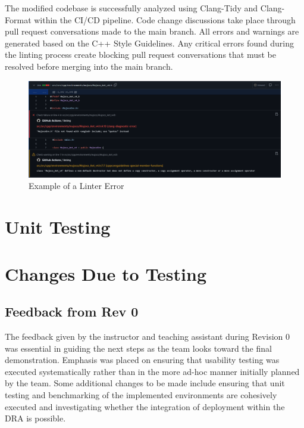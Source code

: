 \documentclass[12pt, titlepage]{article}
\begin{document}
The modified codebase is successfully analyzed using Clang-Tidy and Clang-Format within the CI/CD pipeline. 
Code change discussions take place through pull request conversations made to the main branch. 
All errors and warnings are generated based on the C++ Style Guidelines. 
Any critical errors found during the linting process create blocking pull request conversations that must be resolved before merging into the main branch.

\begin{figure}[h]
  \centering
  \includegraphics[width=1\textwidth]{linter-example.png}
  \caption{Example of a Linter Error}
  \label{fig:myimage}
\end{figure}

\section{Unit Testing}

\section{Changes Due to Testing}

\subsection{Feedback from Rev 0}
The feedback given by the instructor and teaching assistant during Revision 0 was essential in guiding the next steps as the team looks toward the final demonstration.
Emphasis was placed on ensuring that usability testing was executed systematically rather than in the more ad-hoc manner initially planned by the team.
Some additional changes to be made include ensuring that unit testing and benchmarking of the implemented environments are cohesively executed and investigating whether the integration of deployment within the DRA is possible.
\end{document}
